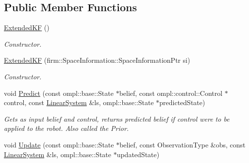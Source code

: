\subsection*{\-Public \-Member \-Functions}
\begin{DoxyCompactItemize}
\item 
\hypertarget{class_extended_k_f_ab97e8270ba3204edacd21a4915d913a4}{\hyperlink{class_extended_k_f_ab97e8270ba3204edacd21a4915d913a4}{\-Extended\-K\-F} ()}\label{class_extended_k_f_ab97e8270ba3204edacd21a4915d913a4}

\begin{DoxyCompactList}\small\item\em \-Constructor. \end{DoxyCompactList}\item 
\hypertarget{class_extended_k_f_a4fd20fe66ee89ad9c4103557afc9836c}{\hyperlink{class_extended_k_f_a4fd20fe66ee89ad9c4103557afc9836c}{\-Extended\-K\-F} (firm\-::\-Space\-Information\-::\-Space\-Information\-Ptr si)}\label{class_extended_k_f_a4fd20fe66ee89ad9c4103557afc9836c}

\begin{DoxyCompactList}\small\item\em \-Constructor. \end{DoxyCompactList}\item 
\hypertarget{class_extended_k_f_aa622a74dcda7a4abb78334df8c850a3e}{void \hyperlink{class_extended_k_f_aa622a74dcda7a4abb78334df8c850a3e}{\-Predict} (const ompl\-::base\-::\-State $\ast$belief, const ompl\-::control\-::\-Control $\ast$control, const \hyperlink{class_linear_system}{\-Linear\-System} \&ls, ompl\-::base\-::\-State $\ast$predicted\-State)}\label{class_extended_k_f_aa622a74dcda7a4abb78334df8c850a3e}

\begin{DoxyCompactList}\small\item\em \-Gets as input belief and control, returns predicted belief if control were to be applied to the robot. \-Also called the \-Prior. \end{DoxyCompactList}\item 
\hypertarget{class_extended_k_f_ae89c058d2f53b4740957d3234110ad50}{void \hyperlink{class_extended_k_f_ae89c058d2f53b4740957d3234110ad50}{\-Update} (const ompl\-::base\-::\-State $\ast$belief, const \-Observation\-Type \&obs, const \hyperlink{class_linear_system}{\-Linear\-System} \&ls, ompl\-::base\-::\-State $\ast$updated\-State)}\label{class_extended_k_f_ae89c058d2f53b4740957d3234110ad50}


\end{DoxyCompactItemize}

